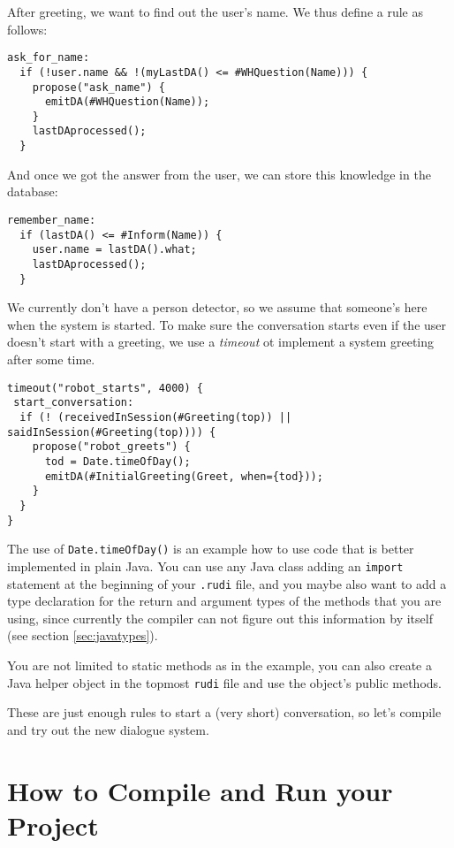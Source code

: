 After greeting, we want to find out the user's name. We thus define a rule as
follows:

\begin{lstlisting}
ask_for_name:
  if (!user.name && !(myLastDA() <= #WHQuestion(Name))) {
    propose("ask_name") {
      emitDA(#WHQuestion(Name));
    }
    lastDAprocessed();
  }
\end{lstlisting}

And once we got the answer from the user, we can store this knowledge in the
database:

\begin{lstlisting}
remember_name:
  if (lastDA() <= #Inform(Name)) {
    user.name = lastDA().what;
    lastDAprocessed();
  }
\end{lstlisting}

We currently don't have a person detector, so we assume that someone's here
when the system is started. To make sure the conversation starts even if the
user doesn't start with a greeting, we use a \emph{timeout} ot implement a
system greeting after some time.

\begin{lstlisting}
timeout("robot_starts", 4000) {
 start_conversation:
  if (! (receivedInSession(#Greeting(top)) || saidInSession(#Greeting(top)))) {
    propose("robot_greets") {
      tod = Date.timeOfDay();
      emitDA(#InitialGreeting(Greet, when={tod}));
    }
  }
}
\end{lstlisting}

The use of \texttt{Date.timeOfDay()} is an example how to use code
that is better implemented in plain Java. You can use any Java class
adding an \texttt{import} statement at the beginning of your
\texttt{.rudi} file, and you maybe also want to add a type declaration
for the return and argument types of the methods that you are using,
since currently the compiler can not figure out this information by
itself (see section \ref{sec:javatypes}).

You are not limited to static methods as in the example, you can also
create a Java helper object in the topmost \texttt{rudi} file and use
the object's public methods.

These are just enough rules to start a (very short) conversation, so
let's compile and try out the new dialogue system.

\section{How to Compile and Run your Project}\label{sec:config}

